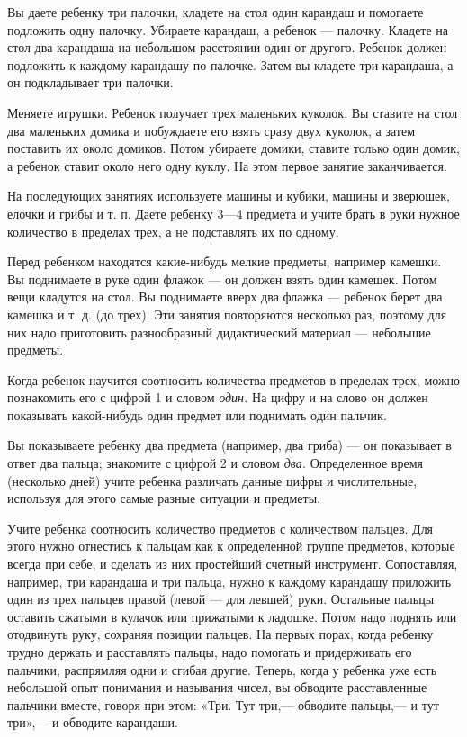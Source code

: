 \documentclass{book}
\renewcommand{\emph}[1]{\textit{#1}}
\begin{document}
Вы даете ребенку три палочки, кладете на стол один карандаш и помогаете
подложить одну палочку. Убираете карандаш, а ребенок --- палочку.
Кладете на стол два карандаша на небольшом расстоянии один от другого.
Ребенок должен подложить к каждому карандашу по палочке. Затем вы
кладете три карандаша, а он подкладывает три палочки.

Меняете игрушки. Ребенок получает трех маленьких куколок. Вы ставите на
стол два маленьких домика и побуждаете его взять сразу двух куколок, а
затем поставить их около домиков. Потом убираете домики, ставите только
один домик, а ребенок ставит около него одну куклу. На этом первое
занятие заканчивается.

На последующих занятиях используете машины и кубики, машины и зверюшек,
елочки и грибы и т. п. Даете ребенку 3---4 предмета и учите брать в руки
нужное количество в пределах трех, а не подставлять их по одному.

Перед ребенком находятся какие-нибудь мелкие предметы, например камешки.
Вы поднимаете в руке один флажок --- он должен взять один камешек. Потом
вещи кладутся на стол. Вы поднимаете вверх два флажка --- ребенок берет
два камешка и т. д. (до трех). Эти занятия повторяются несколько раз,
поэтому для них надо приготовить разнообразный дидактический материал
--- небольшие предметы.

Когда ребенок научится соотносить количества предметов в пределах трех,
можно познакомить его с цифрой 1 и словом \emph{один.} На цифру и на
слово он должен показывать какой-нибудь один предмет или поднимать один
пальчик.

Вы показываете ребенку два предмета (например, два гриба) --- он
показывает в ответ два пальца; знакомите с цифрой 2 и словом \emph{два.}
Определенное время (несколько дней) учите ребенка различать данные цифры
и числительные, используя для этого самые разные ситуации и предметы.

Учите ребенка соотносить количество предметов с количеством пальцев. Для
этого нужно отнестись к пальцам как к определенной группе предметов,
которые всегда при себе, и сделать из них простейший счетный инструмент.
Сопоставляя, например, три карандаша и три пальца, нужно к каждому
карандашу приложить один из трех пальцев правой (левой --- для левшей)
руки. Остальные пальцы оставить сжатыми в кулачок или прижатыми к
ладошке. Потом надо поднять или отодвинуть руку, сохраняя позиции
пальцев. На первых порах, когда ребенку трудно держать и расставлять
пальцы, надо помогать и придерживать его пальчики, распрямляя одни и
сгибая другие. Теперь, когда у ребенка уже есть небольшой опыт понимания
и называния чисел, вы обводите расставленные пальчики вместе, говоря при
этом: «Три. Тут три,--- обводите пальцы,--- и тут три»,--- и обводите
карандаши.
\end{document}
